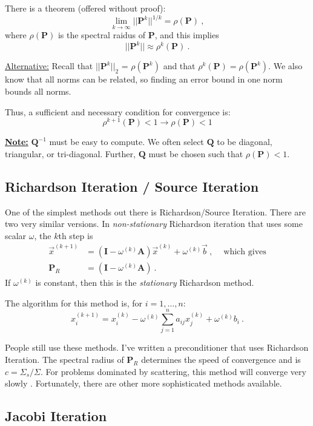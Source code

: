 \documentclass[12pt]{article}
\newcommand{\ve}[1]{\ensuremath{\mathbf{#1}}}
\begin{document}
There is a theorem (offered without proof):
\[\lim_{k \rightarrow \infty} || \ve{P}^k ||^{1/k} = \rho	(\ve{P})\:,\]
where $\rho(\ve{P})$ is the spectral raidus of $\ve{P}$, and this implies
\[|| \ve{P}^k || \approx \rho^k (\ve{P})\:.\]

\underline{Alternative:} Recall that $|| \ve{P}^k ||_2$ = $\rho(\ve{P}^k)$ and that $ \rho^k (\ve{P}) = \rho(\ve{P}^k)$. We also know that all norms can be related, so finding an error bound in one norm bounds all norms. 

Thus, a sufficient and necessary condition for convergence is:
\[\rho^{k+1}(\ve{P}) < 1 \rightarrow \rho(\ve{P}) < 1 \]

\underline{\textbf{Note:}} $\ve{Q}^{-1}$ must be easy to compute. We often select $\ve{Q}$ to be diagonal, triangular, or tri-diagonal. Further, $\ve{Q}$ must be chosen such that $\rho(\ve{P}) < 1$.

\subsection*{Richardson Iteration / Source Iteration}

One of the simplest methods out there is Richardson/Source Iteration. There are two very similar versions. In \textit{non-stationary} Richardson iteration that uses some scalar $\omega$, the $k$th step is
%
\begin{align*}
  \vec{x}^{(k+1)} &= (\ve{I} - \omega^{(k)}\ve{A})\vec{x}^{(k)} + \omega^{(k)}\vec{b} \:, \quad\ \text{which gives} \\
  \ve{P}_R &= (\ve{I} - \omega^{(k)}\ve{A})\:.
\end{align*}
%
If $\omega^{(k)}$ is constant, then this is the \textit{stationary} Richardson method. 

The algorithm for this method is, for $i = 1, \dots, n$:
\[ x^{(k+1)}_i =  x^{(k)}_i - \omega^{(k)} \sum_{j=1}^{n} a_{ij}x_j^{(k)} + \omega^{(k)} b_i \:.\]

People still use these methods. I've written a preconditioner that uses Richardson Iteration. The spectral radius of $\ve{P}_R$ determines the speed of convergence and is $c = \Sigma_s / \Sigma$. For problems dominated by scattering, this method will converge very slowly \cite{Evans2009d}. Fortunately, there are other more sophisticated methods available. 

\subsection*{Jacobi Iteration}
\end{document}
